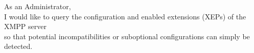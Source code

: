As an Administrator,\\
I would like to query the configuration and enabled extensions (XEPs) of the XMPP server\\
so that potential incompatibilities or suboptional configurations can simply be detected.





